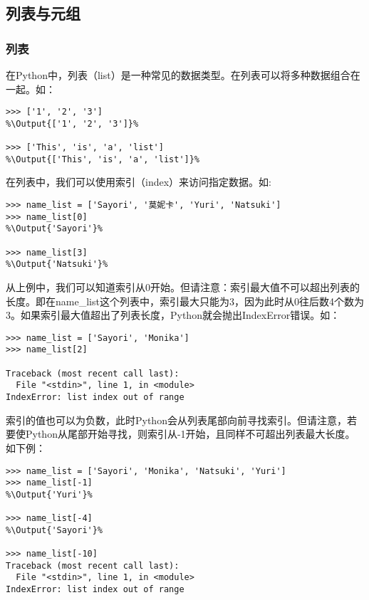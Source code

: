\documentclass[../../Main.tex]{subfiles}
\begin{document}
\subsection{列表与元组}

\subsubsection{列表}

在Python中，列表（list）是一种常见的数据类型。在列表可以将多种数据组合在一起。如：
\begin{lstlisting}
>>> ['1', '2', '3']
%\Output{['1', '2', '3']}%

>>> ['This', 'is', 'a', 'list']
%\Output{['This', 'is', 'a', 'list']}%

\end{lstlisting}


在列表中，我们可以使用索引（index）来访问指定数据。如:
\begin{lstlisting}
>>> name_list = ['Sayori', '莫妮卡', 'Yuri', 'Natsuki']
>>> name_list[0]
%\Output{'Sayori'}%

>>> name_list[3]
%\Output{'Natsuki'}%
\end{lstlisting}

\begin{Warning}
    从上例中，我们可以知道索引从0开始。但请注意：索引最大值不可以超出列表的长度。即在name\_list这个列表中，索引最大只能为3，因为此时从0往后数4个数为3。如果索引最大值超出了列表长度，Python就会抛出IndexError错误。如：
    \begin{lstlisting}[numbers=none]
>>> name_list = ['Sayori', 'Monika']
>>> name_list[2]

Traceback (most recent call last):
  File "<stdin>", line 1, in <module>
IndexError: list index out of range
    \end{lstlisting}
\end{Warning}

\begin{ExtraKnowledge}
    索引的值也可以为负数，此时Python会从列表尾部向前寻找索引。但请注意，若要使Python从尾部开始寻找，则索引从-1开始，且同样不可超出列表最大长度。如下例：
    \begin{lstlisting}[numbers=none]
>>> name_list = ['Sayori', 'Monika', 'Natsuki', 'Yuri']
>>> name_list[-1]
%\Output{'Yuri'}%

>>> name_list[-4]
%\Output{'Sayori'}%

>>> name_list[-10]
Traceback (most recent call last):
  File "<stdin>", line 1, in <module>
IndexError: list index out of range
    \end{lstlisting}
\end{ExtraKnowledge}
\end{document}
